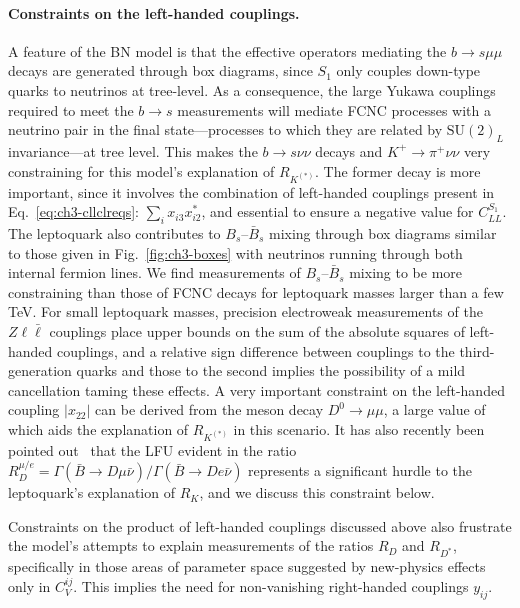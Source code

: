 \paragraph{Constraints on the left-handed couplings.} A feature of the BN model
is that the effective operators mediating the $b \to s \mu \mu$ decays are
generated through box diagrams, since $S_{1}$ only couples down-type quarks to
neutrinos at tree-level. As a consequence, the large Yukawa couplings required
to meet the $b \to s$ measurements will mediate FCNC processes with a neutrino
pair in the final state---processes to which they are related by
$\textrm{SU}(2)_L$ invariance---at tree level. This makes the $b \to s \nu \nu$
decays and $K^+ \to \pi^+ \nu \nu$ very constraining for this model's
explanation of $R_{K^{(*)}}$. The former decay is more important, since it
involves the combination of left-handed couplings present in
Eq.~\eqref{eq:ch3-cllclreqs}: $\sum_{i} x_{i3}x^*_{i2}$, and essential to ensure a
negative value for $C^{S_{1}}_{LL}$. The leptoquark also contributes to
$B_s$--$\bar{B}_s$ mixing through box diagrams similar to those given in
Fig.~\ref{fig:ch3-boxes} with neutrinos running through both internal fermion lines.
We find measurements of $B_s$--$\bar{B}_s$ mixing to be more constraining than
those of FCNC decays for leptoquark masses larger than a few TeV. For small
leptoquark masses, precision electroweak measurements of the $Z\ell \bar{\ell}$
couplings place upper bounds on the sum of the absolute squares of left-handed
couplings, and a relative sign difference between couplings to the
third-generation quarks and those to the second implies the possibility of a
mild cancellation taming these effects. A very important constraint on the
left-handed coupling $|x_{22}|$ can be derived from the meson decay $D^0 \to \mu
\mu$, a large value of which aids the explanation of $R_{K^{(*)}}$ in this
scenario. It has also recently been pointed out~\cite{Becirevic:2016oho} that
the LFU evident in the ratio $R_{D}^{\mu/e} = \Gamma(\bar{B}\rightarrow D \mu
\bar{\nu}) / \Gamma(\bar{B}\rightarrow D e \bar{\nu})$ represents a significant
hurdle to the leptoquark's explanation of $R_{K}$, and we discuss this
constraint below.

Constraints on the product of left-handed couplings discussed above also
frustrate the model's attempts to explain measurements of the ratios $R_D$ and
$R_{D^{*}}$, specifically in those areas of parameter space suggested by
new-physics effects only in $C_V^{ij}$. This implies the need for non-vanishing
right-handed couplings $y_{ij}$.

